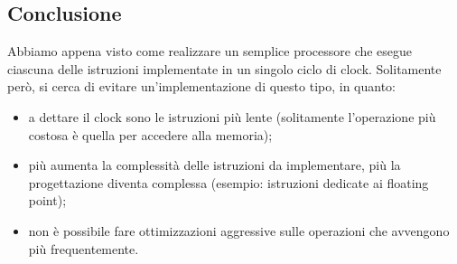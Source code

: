 \documentclass[class=book, crop=false, oneside]{standalone}
\begin{document}
\subsection*{Conclusione}
Abbiamo appena visto come realizzare un semplice processore che esegue ciascuna delle istruzioni implementate in un singolo ciclo di clock. Solitamente però, si cerca di evitare un'implementazione di questo tipo, in quanto:
\begin{itemize}
	\item a dettare il clock sono le istruzioni più lente (solitamente l'operazione più costosa è quella per accedere alla memoria);
	\item più aumenta la complessità delle istruzioni da implementare, più la progettazione diventa complessa (esempio: istruzioni dedicate ai floating point);
	\item non è possibile fare ottimizzazioni aggressive sulle operazioni che avvengono più frequentemente.
\end{itemize}
\end{document}
